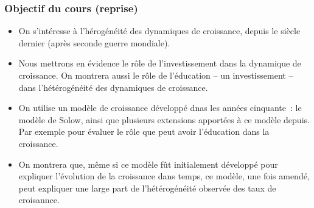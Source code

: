 \documentclass[10pt,notheorems]{beamer}
\theoremstyle{plain}
\theoremstyle{definition} %
\begin{document}
\begin{frame}
  \frametitle{Objectif du cours (reprise)}

  \begin{itemize}

  \item On s'intéresse à l'hérogénéité des dynamiques de croissance,
    depuis le siècle dernier (après seconde guerre mondiale).\newline

  \item Nous mettrons en évidence le rôle de l'investissement dans la
    dynamique de croissance. On montrera aussi le rôle de l'éducation
    -- un investissement -- dans l'hétérogénéité des dynamiques de
    croissance.\newline

  \item On utilise un modèle de croissance développé dnas les années
    cinquante~: le modèle de Solow, ainsi que plusieurs extensions
    apportées à ce modèle depuis. Par exemple pour évaluer le rôle que
    peut avoir l'éducation dans la croissance.\newline

  \item On montrera que, même si ce modèle fût initialement développé
    pour expliquer l'évolution de la croissance dans temps, ce modèle,
    une fois amendé, peut expliquer une large part de l'hétérogénéité
    observée des taux de croisannce.

  \end{itemize}

\end{frame}
\end{document}
